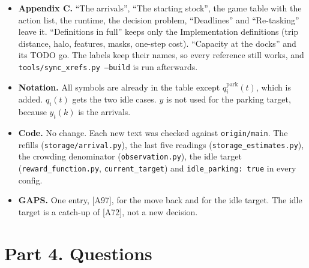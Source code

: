 \documentclass[11pt,a4paper]{article}
\begin{document}
\begin{itemize}[leftmargin=1.4em]
  \item \textbf{Appendix C.} ``The arrivals'', ``The starting stock'', the
    game table with the action list, the runtime, the decision problem,
    ``Deadlines'' and ``Re-tasking'' leave it. ``Definitions in full'' keeps
    only the Implementation definitions (trip distance, halo, features, masks,
    one-step cost). ``Capacity at the docks'' and its TODO go. The labels
    keep their names, so every reference still works, and
    \texttt{tools/sync\_xrefs.py --build} is run afterwards.
  \item \textbf{Notation.} All symbols are already in the table except
    $q^{\mathrm{park}}_i(t)$, which is added. $q_i(t)$ gets the two idle
    cases. $y$ is not used for the parking target, because $y_t(k)$ is the
    arrivals.
  \item \textbf{Code.} No change. Each new text was checked against
    \texttt{origin/main}. The refills (\texttt{storage/arrival.py}), the last
    five readings (\texttt{storage\_estimates.py}), the crowding denominator
    (\texttt{observation.py}), the idle target (\texttt{reward\_function.py},
    \texttt{current\_target}) and \texttt{idle\_parking: true} in every config.
  \item \textbf{GAPS.} One entry, [A97], for the move back and for the idle
    target. The idle target is a catch-up of [A72], not a new decision.
\end{itemize}

\section*{Part 4. Questions}
\end{document}
